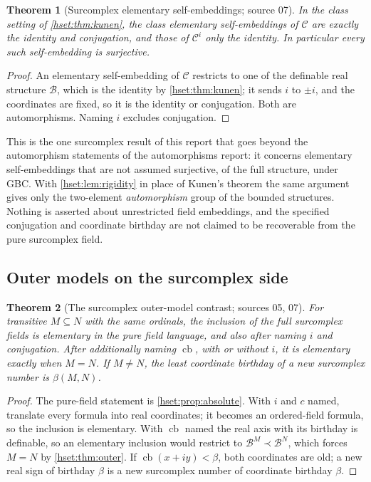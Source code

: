 \documentclass[11pt,letterpaper]{article}
\newtheorem{theorem}{Theorem}[section]
\theoremstyle{definition}
\theoremstyle{remark}
\newcommand{\B}{\mathcal B}
\newcommand{\C}{\mathcal C}
\newcommand{\cb}{\operatorname{cb}}
\begin{document}
\begin{theorem}[Surcomplex elementary self-embeddings; source 07]
\label{hset:thm:complex-rigid}
In the class setting of \cref{hset:thm:kunen}, the class elementary
self-embeddings of $\C$ are exactly the identity and conjugation, and those of
$\C^i$ only the identity. In particular every such self-embedding is surjective.
\end{theorem}
\begin{proof}
An elementary self-embedding of $\C$ restricts to one of the definable real
structure $\B$, which is the identity by \cref{hset:thm:kunen}; it sends $i$ to
$\pm i$, and the coordinates are fixed, so it is the identity or conjugation.
Both are automorphisms. Naming $i$ excludes conjugation.
\end{proof}

This is the one surcomplex result of this report that goes beyond the
automorphism statements of the automorphisms report: it concerns elementary
self-embeddings that are not assumed surjective, of the full structure, under
GBC. With \cref{hset:lem:rigidity} in place of Kunen's theorem the same argument
gives only the two-element \emph{automorphism} group of the bounded structures.
Nothing is asserted about unrestricted field embeddings, and the specified
conjugation and coordinate birthday are not claimed to be recoverable from the
pure surcomplex field.

\subsection{Outer models on the surcomplex side}

\begin{theorem}[The surcomplex outer-model contrast; sources 05, 07]
\label{hset:thm:complex-forcing}
For transitive $M\subseteq N$ with the same ordinals, the inclusion of the full
surcomplex fields is elementary in the pure field language, and also after naming
$i$ and conjugation. After additionally naming $\cb$, with or without $i$, it is
elementary exactly when $M=N$. If $M\ne N$, the least coordinate birthday of a
new surcomplex number is $\beta(M,N)$.
\end{theorem}
\begin{proof}
The pure-field statement is \cref{hset:prop:absolute}. With $i$ and $c$ named,
translate every formula into real coordinates; it becomes an ordered-field
formula, so the inclusion is elementary. With $\cb$ named the real axis with its
birthday is definable, so an elementary inclusion would restrict to
$\B^M\prec\B^N$, which forces $M=N$ by \cref{hset:thm:outer}. If
$\cb(x+iy)<\beta$, both coordinates are old; a new real sign of birthday $\beta$
is a new surcomplex number of coordinate birthday $\beta$.
\end{proof}
\end{document}
